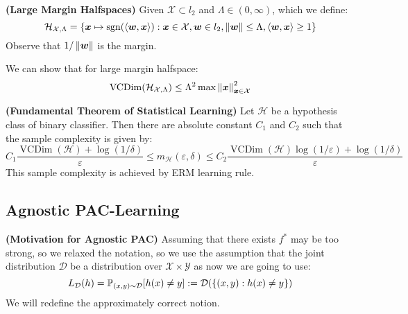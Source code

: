 \begin{definition}{\textbf{(Large Margin Halfspaces)}}
    Given $\mathcal{X}\subset l_2$ and $\Lambda\in(0, \infty)$, which we define:
    \begin{equation*}
        \mathcal{H}_{\mathcal{X},\Lambda} = \left\{ \boldsymbol x\mapsto \operatorname{sgn}(\left\langle \boldsymbol w, \boldsymbol x \right\rangle) : \boldsymbol x\in\mathcal{X}, \boldsymbol w \in l_2, \left\lVert\boldsymbol w\right\rVert \le \Lambda, \left\langle \boldsymbol w, \boldsymbol x \right\rangle \ge 1 \right\} 
    \end{equation*} 
    Observe that $1/\left\lVert\boldsymbol w\right\rVert$ is the margin.
\end{definition}

\begin{theorem}
    We can show that for large margin halfspace:
    \begin{equation*}
        \operatorname{VCDim}(\mathcal{H}_{\mathcal{X},\Lambda}) \le \Lambda^2\max\left\lVert\boldsymbol x\right\rVert^2_{\boldsymbol x\in \mathcal{X}}
    \end{equation*}
\end{theorem}

\begin{theorem}{\textbf{(Fundamental Theorem of Statistical Learning)}}
    Let $\mathcal{H}$ be a hypothesis class of binary classifier. Then there are absolute constant $C_1$ and $C_2$ such that the sample complexity is given by:
    \begin{equation*}
        C_1\frac{\operatorname{VCDim}(\mathcal{H}) + \log(1/\delta)}{\varepsilon} \le m_\mathcal{H}(\varepsilon, \delta) \le C_2\frac{\operatorname{VCDim}(\mathcal{H})\log(1/\varepsilon)+ \log(1/\delta)}{\varepsilon}
    \end{equation*}
    This sample complexity is achieved by ERM learning rule.
\end{theorem}

\subsection{Agnostic PAC-Learning}

\begin{remark}{\textbf{(Motivation for Agnostic PAC)}}
    Assuming that there exists $f^*$ may be too strong, so we relaxed the notation, so we use the assumption that the joint distribution $\mathcal{D}$ be a distribution over $\mathcal{X}\times\mathcal{Y}$ as now we are going to use:
    \begin{equation*}
        L_\mathcal{D}(h) = \mathbb{P}_{(x, y)\sim\mathcal{D}}[h(x) \ne y] := \mathcal{D}(\left\{ (x, y) : h(x) \ne y \right\})
    \end{equation*}
    We will redefine the approximately correct notion.
\end{remark}

